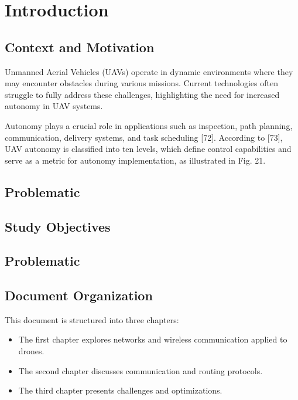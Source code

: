 \chapter*{Introduction}
\section{Context and Motivation}

Unmanned Aerial Vehicles (UAVs) operate in dynamic environments where they may encounter obstacles during various missions. Current technologies often struggle to fully address these challenges, highlighting the need for increased autonomy in UAV systems.

Autonomy plays a crucial role in applications such as inspection, path planning, communication, delivery systems, and task scheduling [72]. According to [73], UAV autonomy is classified into ten levels, which define control capabilities and serve as a metric for autonomy implementation, as illustrated in Fig. 21.

\section{Problematic}

\section{Study Objectives}

\section{Problematic}


\section{Document Organization}
This document is structured into three chapters:
\begin{itemize}
    \item The first chapter explores networks and wireless communication applied to drones.
    \item The second chapter discusses communication and routing protocols.
    \item The third chapter presents challenges and optimizations.
\end{itemize}
